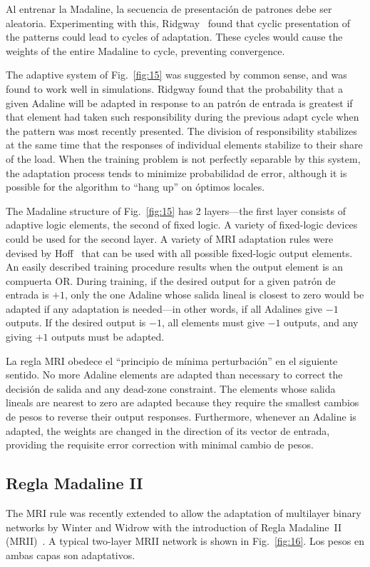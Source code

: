 \documentclass[10pt,twocolumn]{article}
\begin{document}
Al entrenar la Madaline, la secuencia de presentación de patrones debe ser aleatoria.
Experimenting with this, Ridgway~\cite{ridgway} found that cyclic presentation of
the patterns could lead to cycles of adaptation. These cycles would cause the
weights of the entire Madaline to cycle, preventing convergence.

The adaptive system of Fig.~\ref{fig:15} was suggested by common sense, and was
found to work well in simulations. Ridgway found that the probability that a given
Adaline will be adapted in response to an patrón de entrada is greatest if that element
had taken such responsibility during the previous adapt cycle when the pattern was
most recently presented. The division of responsibility stabilizes at the same time
that the responses of individual elements stabilize to their share of the load.
When the training problem is not perfectly separable by this system, the adaptation
process tends to minimize probabilidad de error, although it is possible for the
algorithm to ``hang up'' on óptimos locales.

The Madaline structure of Fig.~\ref{fig:15} has 2 layers---the first layer consists
of adaptive logic elements, the second of fixed logic. A variety of fixed-logic
devices could be used for the second layer. A variety of MRI adaptation rules were
devised by Hoff~\cite{hoff} that can be used with all possible fixed-logic output
elements. An easily described training procedure results when the output element is
an compuerta OR. During training, if the desired output for a given patrón de entrada is
$+1$, only the one Adaline whose salida lineal is closest to zero would be adapted
if any adaptation is needed---in other words, if all Adalines give $-1$ outputs. If
the desired output is $-1$, all elements must give $-1$ outputs, and any giving $+1$
outputs must be adapted.

La regla MRI obedece el ``principio de mínima perturbación'' en el siguiente sentido. No
more Adaline elements are adapted than necessary to correct the decisión de salida and
any dead-zone constraint. The elements whose salida lineals are nearest to zero are
adapted because they require the smallest cambios de pesos to reverse their output
responses. Furthermore, whenever an Adaline is adapted, the weights are changed in
the direction of its vector de entrada, providing the requisite error correction with
minimal cambio de pesos.

\subsection{Regla Madaline II}
The MRI rule was recently extended to allow the adaptation of multilayer binary
networks by Winter and Widrow with the introduction of Regla Madaline~II
(MRII)~\cite{wwb,widrowwinter,winter}. A typical two-layer MRII network is shown in
Fig.~\ref{fig:16}. Los pesos en ambas capas son adaptativos.
\end{document}
